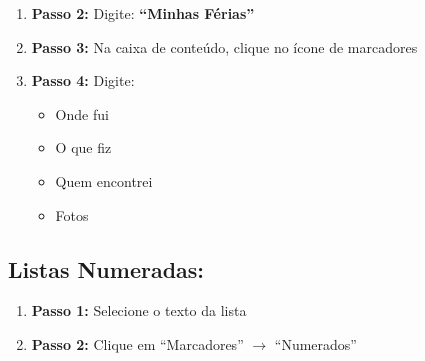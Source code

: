 \documentclass[11pt]{article}
\begin{document}
\begin{multicols}{2}
\begin{enumerate}
\item \textbf{Passo 2:} Digite: \textbf{``Minhas Férias''}

\item \textbf{Passo 3:} Na caixa de conteúdo, clique no ícone de marcadores

\item \textbf{Passo 4:} Digite:
\begin{itemize}
\item Onde fui
\item O que fiz
\item Quem encontrei
\item Fotos
\end{itemize}
\end{enumerate}

\subsection*{Listas Numeradas:}
\begin{enumerate}
\item \textbf{Passo 1:} Selecione o texto da lista
\item \textbf{Passo 2:} Clique em ``Marcadores'' $\rightarrow$ ``Numerados''
\end{enumerate}

\end{multicols}
\end{document}

